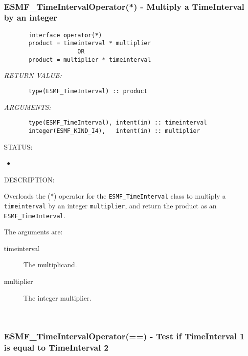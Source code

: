 \mbox{}\hrulefill\ 
 
\subsubsection [ESMF\_TimeIntervalOperator(*)] {ESMF\_TimeIntervalOperator(*) - Multiply a TimeInterval by an integer}


  
\begin{verbatim}       interface operator(*)
       product = timeinterval * multiplier
                     OR
       product = multiplier * timeinterval\end{verbatim}{\em RETURN VALUE:}
\begin{verbatim}       type(ESMF_TimeInterval) :: product\end{verbatim}{\em ARGUMENTS:}
\begin{verbatim}       type(ESMF_TimeInterval), intent(in) :: timeinterval
       integer(ESMF_KIND_I4),   intent(in) :: multiplier\end{verbatim}
{\sf STATUS:}
   \begin{itemize}
   \item{}
   \end{itemize}
  
{\sf DESCRIPTION:\\ }


       Overloads the (*) operator for the {\tt ESMF\_TimeInterval} class to
       multiply a {\tt timeinterval} by an integer {\tt multiplier},
       and return the product as an {\tt ESMF\_TimeInterval}.
  
       The arguments are:
       \begin{description}
       \item[timeinterval]        
            The multiplicand.
       \item[multiplier]
            The integer multiplier.
       \end{description}
   
 
\mbox{}\hrulefill\ 
 
\subsubsection [ESMF\_TimeIntervalOperator(==)] {ESMF\_TimeIntervalOperator(==) - Test if TimeInterval 1 is equal to TimeInterval 2}


